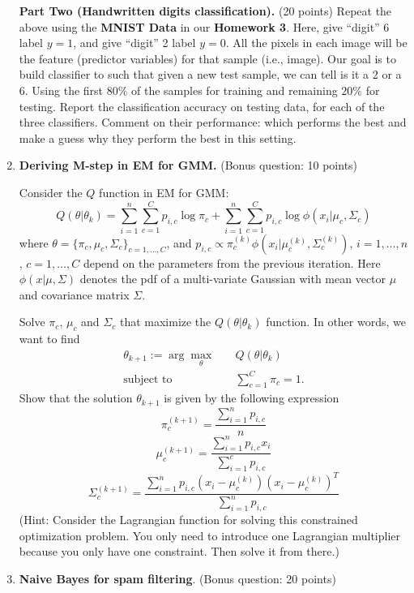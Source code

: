 \documentclass[twoside,10pt]{article}
\begin{document}
\begin{enumerate}
\textbf{Part Two (Handwritten digits classification).} (20 points) Repeat the above using the \textbf{MNIST Data} in our \textbf{Homework 3}. Here, give ``digit'' 6 label $y = 1$, and give ``digit'' 2 label $y = 0$. All the pixels in each image will be the feature (predictor variables) for that sample (i.e., image). Our goal is to build classifier to such that given a new test sample, we can tell is it a 2 or a 6. Using the first $80\%$ of the samples for training and remaining $20\%$ for testing. Report the classification accuracy on testing data, for each of the three classifiers. Comment on their performance: which performs the best and make a guess why they perform the best in this setting. 

\item {\bf Deriving M-step in EM for GMM.} (Bonus question: 10 points)

Consider the $Q$ function in EM for GMM:
\[
Q(\theta|\theta_k) = \sum_{i=1}^n \sum_{c=1}^C p_{i, c} \log \pi_c
+ \sum_{i=1}^n \sum_{c=1}^C p_{i, c} \log \phi(x_i|\mu_c, \Sigma_c)
\] 
where $\theta= \{\pi_c, \mu_c, \Sigma_c\}_{c=1, \ldots, C}$, and  $p_{i,c} \propto \pi_c^{(k)} \phi(x_i|\mu_c^{(k)}, \Sigma_c^{(k)})$, $i = 1, \ldots, n$, $c = 1, \ldots, C$ depend on the parameters from the previous iteration. Here $\phi(x|\mu, \Sigma)$ denotes the pdf of a multi-variate Gaussian with mean vector $\mu$ and covariance matrix $\Sigma$. 

Solve $\pi_c$, $\mu_c$ and $\Sigma_c$ that maximize the $Q(\theta|\theta_k)$ function.
In other words, we want to find
\begin{equation*}
\begin{split}
\theta_{k+1} := \arg\max_{\theta} &\quad Q(\theta|\theta_k)\\
\mbox{subject to} &\quad \sum_{c = 1}^C \pi_{c} = 1.
\end{split}
\end{equation*}
Show that the solution $\theta_{k+1}$ is given by the following expression
\[
\pi_c^{(k+1)} = \frac{\sum_{i=1}^n p_{i,c}}{n}
\]
\[
\mu_c^{(k+1)}  = \frac{\sum_{i=1}^n p_{i,c} x_i}{\sum_{i=1}^c p_{i,c}}
\]
\[
\Sigma_c^{(k+1)} = \frac{\sum_{i=1}^n p_{i,c} (x_i - \mu_c^{(k)})(x_i - \mu_c^{(k)})^T}{\sum_{i=1}^n p_{i,c}}
\]
(Hint: Consider the Lagrangian function for solving this constrained optimization problem. You only need to introduce one Lagrangian multiplier because you only have one constraint. Then solve it from there.)



\item {\bf Naive Bayes for spam filtering}. (Bonus question: 20 points) 


\end{enumerate}
\end{document}
